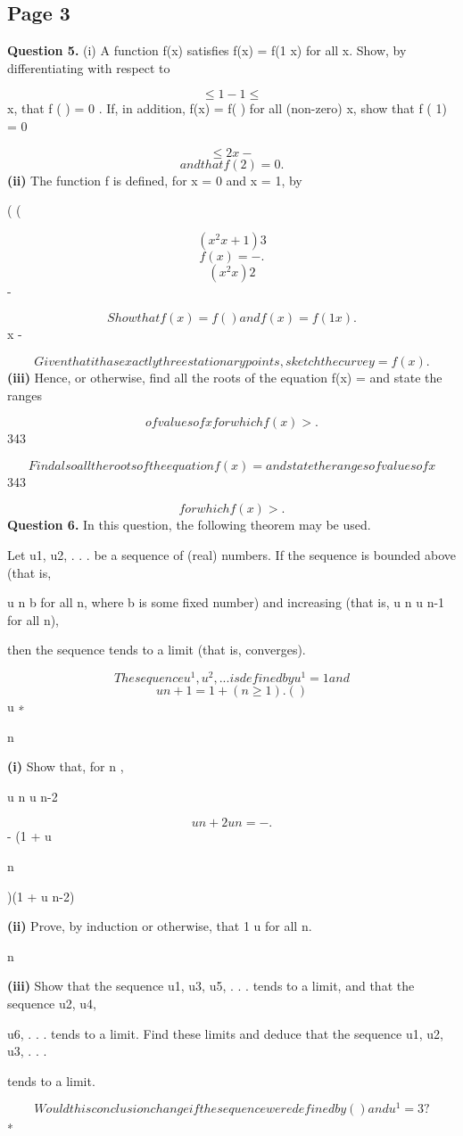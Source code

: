 \documentclass[12pt]{article}
\begin{document}
\subsection*{Page 3}
\begin{flushleft}
\bigskip\textbf{Question 5.} (i) A function f(x) satisfies f(x) = f(1 x) for all x. Show, by differentiating with respect to\par
\[\leq 1 - 1 \leq\]
x, that f ( ) = 0 . If, in addition, f(x) = f( ) for all (non-zero) x, show that f ( 1) = 0\par
\[\leq 2 x -\]
\[and that f (2) = 0.\]
\textbf{(ii)} The function f is defined, for x = 0 and x = 1, by\par
( (\par
\[(x^2 x + 1)3\]
\[f(x) = - .\]
\[(x^2 x)2\]
-\par
\[Show that f(x) = f( ) and f(x) = f(1 x).\]
x -\par
\[Given that it has exactly three stationary points, sketch the curve y = f(x).\]
\textbf{(iii)} Hence, or otherwise, find all the roots of the equation f(x) = and state the ranges\par
\[of values of x for which f(x) > .\]
343\par
\[Find also all the roots of the equation f(x) = and state the ranges of values of x\]
343\par
\[for which f(x) > .\]
\bigskip\textbf{Question 6.} In this question, the following theorem may be used.\par
Let u1, u2, . . . be a sequence of (real) numbers. If the sequence is bounded above (that is,\par
u n \leq b for all n, where b is some fixed number) and increasing (that is, u n \geq u n-1 for all n),\par
then the sequence tends to a limit (that is, converges).\par
\[The sequence u^1, u^2, . . . is defined by u^1 = 1 and\]
\[u n+1 = 1 + (n \geq 1) . ( )\]
u ∗\par
n\par
\textbf{(i)} Show that, for n ,\par
u n u n-2\par
\[u n+2 u n = - .\]
- (1 + u\par
n\par
)(1 + u n-2)\par
\textbf{(ii)} Prove, by induction or otherwise, that 1 \leq u  for all n.\par
n\par
\textbf{(iii)} Show that the sequence u1, u3, u5, . . . tends to a limit, and that the sequence u2, u4,\par
u6, . . . tends to a limit. Find these limits and deduce that the sequence u1, u2, u3, . . .\par
tends to a limit.\par
\[Would this conclusion change if the sequence were defined by ( ) and u^1 = 3?\]
∗\par
\end{flushleft}
\end{document}
